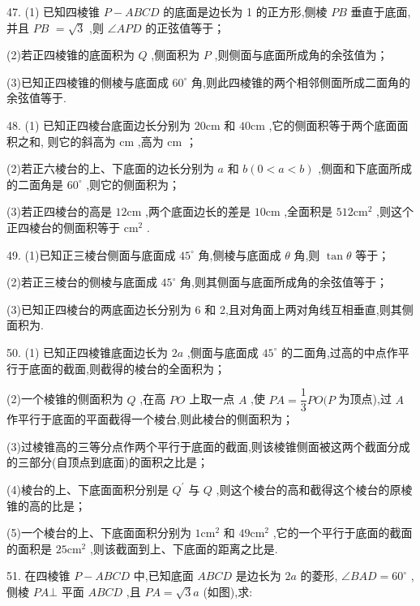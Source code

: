 47. (1) 已知四棱锥 $P - {ABCD}$ 的底面是边长为 1 的正方形,侧棱 ${PB}$ 垂直于底面,并且 ${PB}$  $= \sqrt{3}$ ,则 $\angle {APD}$ 的正弦值等于\blkda{}；

(2)若正四棱锥的底面积为 $Q$ ,侧面积为 $P$ ,则侧面与底面所成角的余弦值为\blkda{}；

(3)已知正四棱锥的侧棱与底面成 ${60}^{ \circ  }$ 角,则此四棱锥的两个相邻侧面所成二面角的余弦值等于\blkda{}.

48. (1) 已知正四棱台底面边长分别为 ${20}\mathrm{{cm}}$ 和 ${40}\mathrm{{cm}}$ ,它的侧面积等于两个底面面积之和, 则它的斜高为\blkda{} $\mathrm{{cm}}$ ,高为\blkda{} $\mathrm{{cm}}$ ；

(2)若正六棱台的上、下底面的边长分别为 $a$ 和 $b\left( {0 < a < b}\right)$ ,侧面和下底面所成的二面角是 ${60}^{ \circ  }$ ,则它的侧面积为\blkda{}；

(3)若正四棱台的高是 ${12}\mathrm{{cm}}$ ,两个底面边长的差是 ${10}\mathrm{{cm}}$ ,全面积是 ${512}{\mathrm{{cm}}}^{2}$ ,则这个正四棱台的侧面积等于\blkda{} ${\mathrm{{cm}}}^{2}$ .

49. (1)已知正三棱台侧面与底面成 ${45}^{ \circ  }$ 角,侧棱与底面成 $\theta$ 角,则 $\tan \theta$ 等于\blkda{}；

(2)若正三棱台的侧棱与底面成 ${45}^{ \circ  }$ 角,则其侧面与底面所成角的余弦值等于\blkda{}；

(3)已知正四棱台的两底面边长分别为 6 和 2,且对角面上两对角线互相垂直,则其侧面积为\blkda{}.

50. (1) 已知正四棱锥底面边长为 ${2a}$ ,侧面与底面成 ${45}^{ \circ  }$ 的二面角,过高的中点作平行于底面的截面,则截得的棱台的全面积为\blkda{}；

(2)一个棱锥的侧面积为 $Q$ ,在高 ${PO}$ 上取一点 $A$ ,使 ${PA} = \dfrac{1}{3}{PO}(P$ 为顶点),过 $A$ 作平行于底面的平面截得一个棱台,则此棱台的侧面积为\blkda{}；

(3)过棱锥高的三等分点作两个平行于底面的截面,则该棱锥侧面被这两个截面分成的三部分(自顶点到底面)的面积之比是\blkda{}；

(4)棱台的上、下底面面积分别是 ${Q}^{\prime }$ 与 $Q$ ,则这个棱台的高和截得这个棱台的原棱锥的高的比是\blkda{}；

(5)一个棱台的上、下底面面积分别为 $1{\mathrm{{cm}}}^{2}$ 和 ${49}{\mathrm{{cm}}}^{2}$ ,它的一个平行于底面的截面的面积是 ${25}{\mathrm{{cm}}}^{2}$ ,则该截面到上、下底面的距离之比是\blkda{}.

51. 在四棱锥 $P - {ABCD}$ 中,已知底面 ${ABCD}$ 是边长为 ${2a}$ 的菱形, $\angle {BAD} = {60}^{ \circ  }$ ,侧棱 ${PA} \bot$ 平面 ${ABCD}$ ,且 ${PA} = \sqrt{3}a$ (如图),求:

